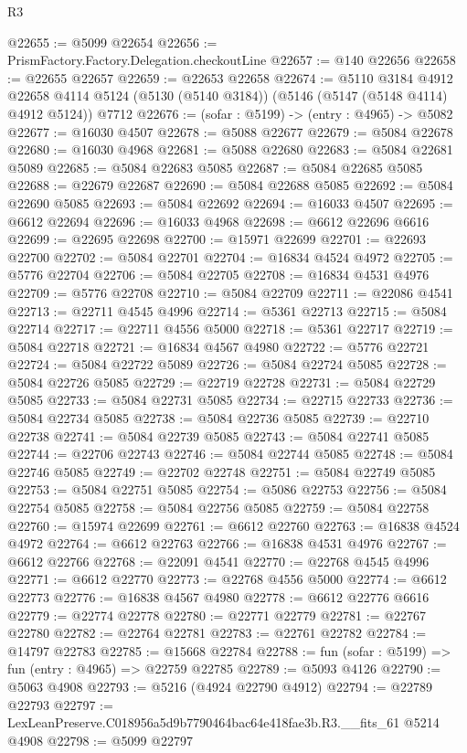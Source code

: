 \begin{lexlean}{R3}
\begin{coremodule}
@22655 := @5099 @22654
@22656 := PrismFactory.Factory.Delegation.checkoutLine
@22657 := @140 @22656
@22658 := @22655 @22657
@22659 := @22653 @22658
@22674 := @5110
    @3184
    @4912
    @22658
    @4114
    @5124
    (@5130 (@5140 @3184))
    (@5146 (@5147 (@5148 @4114) @4912 @5124))
    @7712
@22676 := (sofar : @5199) -> (entry : @4965) -> @5082
@22677 := @16030 @4507
@22678 := @5088 @22677
@22679 := @5084 @22678
@22680 := @16030 @4968
@22681 := @5088 @22680
@22683 := @5084 @22681 @5089
@22685 := @5084 @22683 @5085
@22687 := @5084 @22685 @5085
@22688 := @22679 @22687
@22690 := @5084 @22688 @5085
@22692 := @5084 @22690 @5085
@22693 := @5084 @22692
@22694 := @16033 @4507
@22695 := @6612 @22694
@22696 := @16033 @4968
@22698 := @6612 @22696 @6616
@22699 := @22695 @22698
@22700 := @15971 @22699
@22701 := @22693 @22700
@22702 := @5084 @22701
@22704 := @16834 @4524 @4972
@22705 := @5776 @22704
@22706 := @5084 @22705
@22708 := @16834 @4531 @4976
@22709 := @5776 @22708
@22710 := @5084 @22709
@22711 := @22086 @4541
@22713 := @22711 @4545 @4996
@22714 := @5361 @22713
@22715 := @5084 @22714
@22717 := @22711 @4556 @5000
@22718 := @5361 @22717
@22719 := @5084 @22718
@22721 := @16834 @4567 @4980
@22722 := @5776 @22721
@22724 := @5084 @22722 @5089
@22726 := @5084 @22724 @5085
@22728 := @5084 @22726 @5085
@22729 := @22719 @22728
@22731 := @5084 @22729 @5085
@22733 := @5084 @22731 @5085
@22734 := @22715 @22733
@22736 := @5084 @22734 @5085
@22738 := @5084 @22736 @5085
@22739 := @22710 @22738
@22741 := @5084 @22739 @5085
@22743 := @5084 @22741 @5085
@22744 := @22706 @22743
@22746 := @5084 @22744 @5085
@22748 := @5084 @22746 @5085
@22749 := @22702 @22748
@22751 := @5084 @22749 @5085
@22753 := @5084 @22751 @5085
@22754 := @5086 @22753
@22756 := @5084 @22754 @5085
@22758 := @5084 @22756 @5085
@22759 := @5084 @22758
@22760 := @15974 @22699
@22761 := @6612 @22760
@22763 := @16838 @4524 @4972
@22764 := @6612 @22763
@22766 := @16838 @4531 @4976
@22767 := @6612 @22766
@22768 := @22091 @4541
@22770 := @22768 @4545 @4996
@22771 := @6612 @22770
@22773 := @22768 @4556 @5000
@22774 := @6612 @22773
@22776 := @16838 @4567 @4980
@22778 := @6612 @22776 @6616
@22779 := @22774 @22778
@22780 := @22771 @22779
@22781 := @22767 @22780
@22782 := @22764 @22781
@22783 := @22761 @22782
@22784 := @14797 @22783
@22785 := @15668 @22784
@22788 := fun (sofar : @5199) => fun (entry : @4965) => @22759 @22785
@22789 := @5093 @4126
@22790 := @5063 @4908
@22793 := @5216 (@4924 @22790 @4912)
@22794 := @22789 @22793
@22797 := LexLeanPreserve.C018956a5d9b7790464bac64e418fae3b.R3.__fits_61 @5214 @4908
@22798 := @5099 @22797

\end{coremodule}
\end{lexlean}
